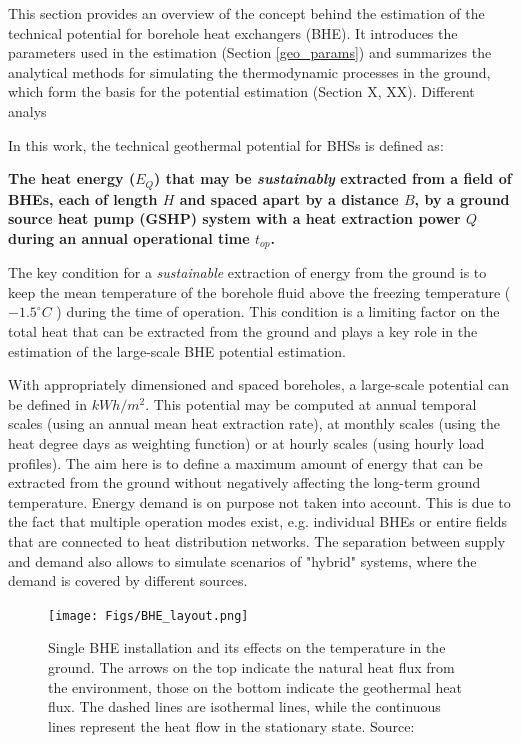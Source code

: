 This section provides an overview of the concept behind the estimation of the technical potential for borehole heat exchangers (BHE). It introduces the parameters used in the estimation (Section \ref{geo_params}) and summarizes the analytical methods for simulating the thermodynamic processes in the ground, which form the basis for the potential estimation (Section X, XX). Different analys

In this work, the technical geothermal potential for BHSs is defined as:

\textbf{The heat energy ($E_Q$) that may be \textit{sustainably} extracted from a field of BHEs, each of length $H$ and spaced apart by a distance $B$, by a ground source heat pump (GSHP) system with a heat extraction power $Q$ during an annual operational time $t_{op}$. }

The key condition for a \textit{sustainable} extraction of energy from the ground is to keep the mean temperature of the borehole fluid above the freezing temperature ($-1.5^\circ C$ \citep{wagner_erdsondenpotenzial_2014}) during the time of operation. This condition is a limiting factor on the total heat that can be extracted from the ground and plays a key role in the estimation of the large-scale BHE potential estimation.

With appropriately dimensioned and spaced boreholes, a large-scale potential can be defined in $kWh/m^2$. This potential may be computed at annual temporal scales (using an annual mean heat extraction rate), at monthly scales (using the heat degree days as weighting function) or at hourly scales (using hourly load profiles).
The aim here is to define a maximum amount of energy that can be extracted from the ground without negatively affecting the long-term ground temperature. Energy demand is on purpose not taken into account. 
This is due to the fact that multiple operation modes exist, e.g. individual BHEs or entire fields that are connected to heat distribution networks. The separation between supply and demand also allows to simulate scenarios of "hybrid" systems, where the demand is covered by different sources.

\begin{figure}
    \centering
    \texttt{[image: Figs/BHE\_layout.png]}
    \caption[Single BHE installation and its effects on the temperature in the ground.]{Single BHE installation and its effects on the temperature in the ground. The arrows on the top indicate the natural heat flux from the environment, those on the bottom indicate the geothermal heat flux. The dashed lines are isothermal lines, while the continuous lines represent the heat flow in the stationary state. Source: \citet{wagner_erdsondenpotenzial_2014}}
    \label{fig:BHE}
\end{figure}


